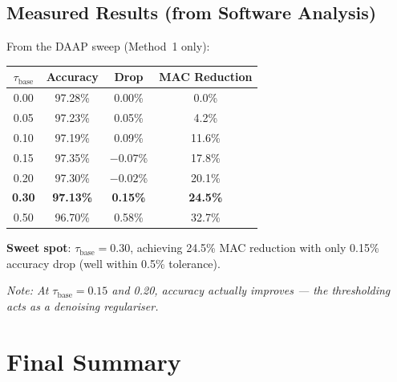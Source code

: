 \documentclass[11pt,a4paper]{article}
\begin{document}
\subsection{Measured Results (from Software Analysis)}

From the DAAP sweep (Method~1 only):

\begin{center}
\begin{tabular}{cccc}
\toprule
$\tau_{\text{base}}$ & \textbf{Accuracy} & \textbf{Drop} & \textbf{MAC Reduction} \\
\midrule
0.00 & 97.28\% & 0.00\% & 0.0\% \\
0.05 & 97.23\% & 0.05\% & 4.2\% \\
0.10 & 97.19\% & 0.09\% & 11.6\% \\
0.15 & 97.35\% & $-0.07$\% & 17.8\% \\
0.20 & 97.30\% & $-0.02$\% & 20.1\% \\
\rowcolor{activegreen!20}
\textbf{0.30} & \textbf{97.13\%} & \textbf{0.15\%} & \textbf{24.5\%} \\
0.50 & 96.70\% & 0.58\% & 32.7\% \\
\bottomrule
\end{tabular}
\end{center}

\noindent\textbf{Sweet spot}: $\tau_{\text{base}} = 0.30$, achieving 24.5\% MAC
reduction with only 0.15\% accuracy drop (well within 0.5\% tolerance).

\noindent\textit{Note: At $\tau_{\text{base}} = 0.15$ and 0.20, accuracy actually
\emph{improves} — the thresholding acts as a denoising regulariser.}

\section{Final Summary}
\label{sec:summary}
\end{document}
